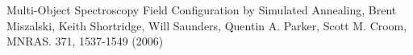 \documentclass{article}
\begin{document}
\begin{thebibliography}{10}
 Multi-Object Spectroscopy
  Field Configuration by  Simulated Annealing, Brent Miszalski, Keith
  Shortridge, Will  Saunders, Quentin A. Parker, Scott M. Croom,
  MNRAS. 371, 1537-1549  (2006)  
\end{thebibliography}
\end{document}

